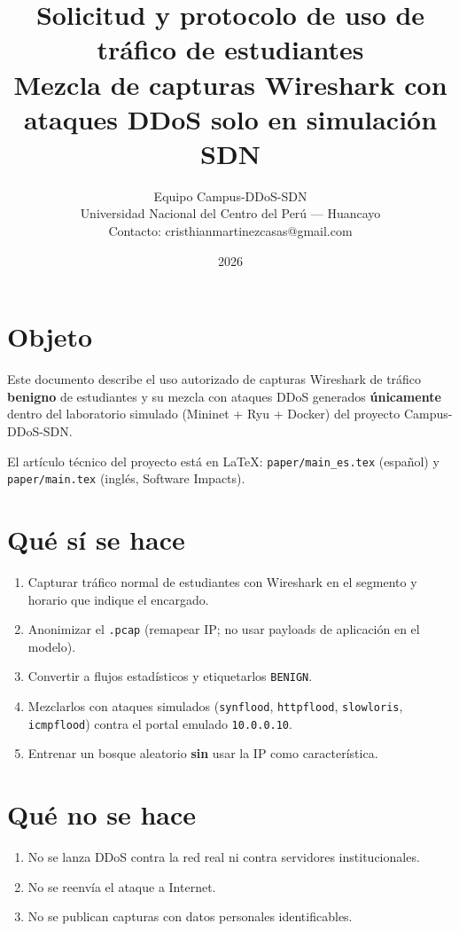 \documentclass[11pt,a4paper]{article}
\title{Solicitud y protocolo de uso de tr\'afico de estudiantes\\
\large Mezcla de capturas Wireshark con ataques DDoS solo en simulaci\'on SDN}
\author{Equipo Campus-DDoS-SDN\\
Universidad Nacional del Centro del Per\'u --- Huancayo\\
Contacto: cristhianmartinezcasas@gmail.com}
\date{2026}
\begin{document}
\maketitle

\section{Objeto}
Este documento describe el uso autorizado de capturas Wireshark de
tr\'afico \textbf{benigno} de estudiantes y su mezcla con ataques DDoS
generados \textbf{\'unicamente} dentro del laboratorio simulado
(Mininet + Ryu + Docker) del proyecto Campus-DDoS-SDN.

El art\'iculo t\'ecnico del proyecto est\'a en LaTeX:
\texttt{paper/main\_es.tex} (espa\~nol) y \texttt{paper/main.tex}
(ingl\'es, Software Impacts).

\section{Qu\'e s\'i se hace}
\begin{enumerate}[leftmargin=*]
  \item Capturar tr\'afico normal de estudiantes con Wireshark en el
        segmento y horario que indique el encargado.
  \item Anonimizar el \texttt{.pcap} (remapear IP; no usar payloads
        de aplicaci\'on en el modelo).
  \item Convertir a flujos estad\'isticos y etiquetarlos
        \texttt{BENIGN}.
  \item Mezclarlos con ataques simulados
        (\texttt{synflood}, \texttt{httpflood}, \texttt{slowloris},
        \texttt{icmpflood}) contra el portal emulado
        \texttt{10.0.0.10}.
  \item Entrenar un bosque aleatorio \textbf{sin} usar la IP como
        caracter\'istica.
\end{enumerate}

\section{Qu\'e no se hace}
\begin{enumerate}[leftmargin=*]
  \item No se lanza DDoS contra la red real ni contra servidores
        institucionales.
  \item No se reenv\'ia el ataque a Internet.
  \item No se publican capturas con datos personales identificables.
\end{enumerate}
\end{document}
